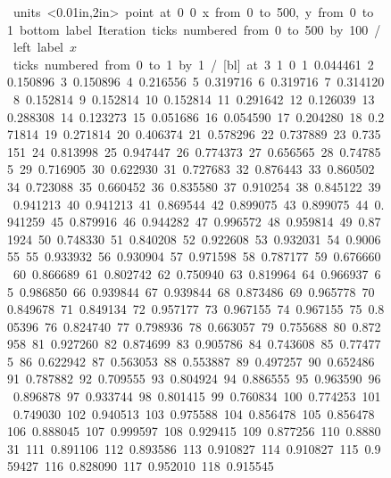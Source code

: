 \begin{figure}
\centering
\mbox{\beginpicture
\setcoordinatesystem units <0.01in,2in> point at 0 0
\setplotarea x from 0 to 500, y from 0 to 1
\axis bottom label {Iteration} ticks numbered from 0 to 500 by 100 /
\axis left label {$x$} ticks numbered from 0 to 1 by 1 /
 [bl] at 3 1
          0
      1   0.044461
      2   0.150896
      3   0.150896
      4   0.216556
      5   0.319716
      6   0.319716
      7   0.314120
      8   0.152814
      9   0.152814
     10   0.152814
     11   0.291642
     12   0.126039
     13   0.288308
     14   0.123273
     15   0.051686
     16   0.054590
     17   0.204280
     18   0.271814
     19   0.271814
     20   0.406374
     21   0.578296
     22   0.737889
     23   0.735151
     24   0.813998
     25   0.947447
     26   0.774373
     27   0.656565
     28   0.747855
     29   0.716905
     30   0.622930
     31   0.727683
     32   0.876443
     33   0.860502
     34   0.723088
     35   0.660452
     36   0.835580
     37   0.910254
     38   0.845122
     39   0.941213
     40   0.941213
     41   0.869544
     42   0.899075
     43   0.899075
     44   0.941259
     45   0.879916
     46   0.944282
     47   0.996572
     48   0.959814
     49   0.871924
     50   0.748330
     51   0.840208
     52   0.922608
     53   0.932031
     54   0.900655
     55   0.933932
     56   0.930904
     57   0.971598
     58   0.787177
     59   0.676660
     60   0.866689
     61   0.802742
     62   0.750940
     63   0.819964
     64   0.966937
     65   0.986850
     66   0.939844
     67   0.939844
     68   0.873486
     69   0.965778
     70   0.849678
     71   0.849134
     72   0.957177
     73   0.967155
     74   0.967155
     75   0.805396
     76   0.824740
     77   0.798936
     78   0.663057
     79   0.755688
     80   0.872958
     81   0.927260
     82   0.874699
     83   0.905786
     84   0.743608
     85   0.774775
     86   0.622942
     87   0.563053
     88   0.553887
     89   0.497257
     90   0.652486
     91   0.787882
     92   0.709555
     93   0.804924
     94   0.886555
     95   0.963590
     96   0.896878
     97   0.933744
     98   0.801415
     99   0.760834
    100   0.774253
    101   0.749030
    102   0.940513
    103   0.975588
    104   0.856478
    105   0.856478
    106   0.888045
    107   0.999597
    108   0.929415
    109   0.877256
    110   0.888031
    111   0.891106
    112   0.893586
    113   0.910827
    114   0.910827
    115   0.959427
    116   0.828090
    117   0.952010
    118   0.915545
}
\end{figure}
